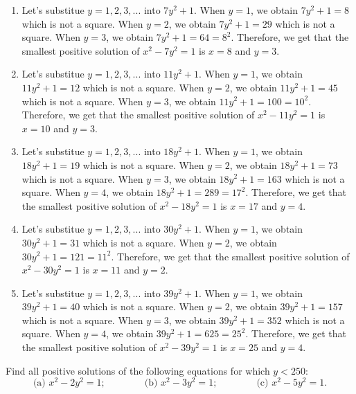 \begin{solution}
    \begin{enumerate}
        \item Let's substitue $y = 1, 2, 3, ...$ into $7y^2 + 1$. When $y = 1$, we obtain $7y^2 + 1 = 8$ which is not a square. When $y = 2$, we obtain $7y^2 + 1 = 29$ which is not a square. When $y = 3$, we obtain $7y^2 + 1 = 64 = 8^2$. Therefore, we get that the smallest positive solution of $x^2 - 7y^2 = 1$ is $x = 8$ and $y = 3$.
        \item Let's substitue $y = 1, 2, 3, ...$ into $11y^2 + 1$. When $y = 1$, we obtain $11y^2 + 1 = 12$ which is not a square. When $y = 2$, we obtain $11y^2 + 1 = 45$ which is not a square. When $y = 3$, we obtain $11y^2 + 1 = 100 = 10^2$. Therefore, we get that the smallest positive solution of $x^2 - 11y^2 = 1$ is $x = 10$ and $y = 3$.
        \item Let's substitue $y = 1, 2, 3, ...$ into $18y^2 + 1$. When $y = 1$, we obtain $18y^2 + 1 = 19$ which is not a square. When $y = 2$, we obtain $18y^2 + 1 = 73$ which is not a square. When $y = 3$, we obtain $18y^2 + 1 = 163$ which is not a square. When $y = 4$, we obtain $18y^2 + 1 = 289 = 17^2$. Therefore, we get that the smallest positive solution of $x^2 - 18y^2 = 1$ is $x = 17$ and $y = 4$.
        \item Let's substitue $y = 1, 2, 3, ...$ into $30y^2 + 1$. When $y = 1$, we obtain $30y^2 + 1 = 31$ which is not a square. When $y = 2$, we obtain $30y^2 + 1 = 121 = 11^2$. Therefore, we get that the smallest positive solution of $x^2 - 30y^2 = 1$ is $x = 11$ and $y = 2$.
        \item Let's substitue $y = 1, 2, 3, ...$ into $39y^2 + 1$. When $y = 1$, we obtain $39y^2 + 1 = 40$ which is not a square. When $y = 2$, we obtain $39y^2 + 1 = 157$ which is not a square. When $y = 3$, we obtain $39y^2 + 1 = 352$ which is not a square. When $y = 4$, we obtain $39y^2 + 1 = 625 = 25^2$. Therefore, we get that the smallest positive solution of $x^2 - 39y^2 = 1$ is $x = 25$ and $y = 4$. \\
    \end{enumerate}
\end{solution}

\begin{exercise}
    Find all positive solutions of the following equations for which $y < 250$:
    $$\text{(a) } x^2 - 2y^2 = 1; \qquad \qquad \text{(b) } x^2 - 3y^2 = 1; \qquad \qquad \text{(c) } x^2 - 5y^2 = 1.$$ \\
\end{exercise}

